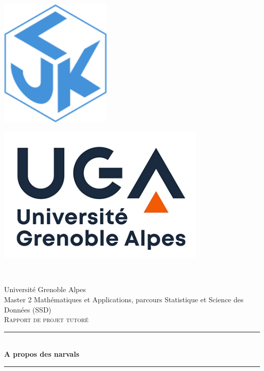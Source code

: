 
\begin{titlepage}
	\begin{minipage}{0.5\textwidth}
		\begin{flushleft}
		    \includegraphics[width=0.4\textwidth]{images/logo_ljk.png}
		\end{flushleft}
	\end{minipage}
	\begin{minipage}{0.5\textwidth}
        \begin{flushright}
            \includegraphics[width=0.75\textwidth]{images/logo_uga.jpeg}
		\end{flushright}
	\end{minipage}\\[1.5 cm]

    \begin{center}
        {\Large Université Grenoble Alpes\\[.5 cm]
        Master 2 Mathématiques et Applications, parcours Statistique et Science des Données (SSD)}\\[1.5 cm]

        \textsc{\LARGE Rapport de projet tutoré}

	    \rule{\linewidth}{0.2 mm} \\[1 cm]
	    {\huge \bfseries A propos des narvals}\\[.7 cm]
	    \rule{\linewidth}{0.2 mm} \\[1.5 cm]


\end{center}
\end{titlepage}
